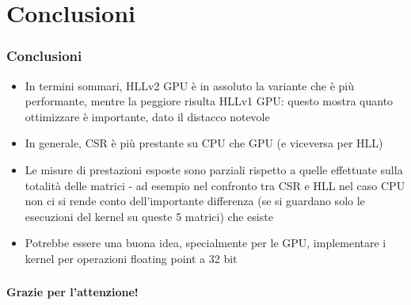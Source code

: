 \documentclass{beamer}
\begin{document}
\section{Conclusioni}
\begin{frame}
	\frametitle{Conclusioni}
	
	\begin{itemize}
		\item 
		In termini sommari, HLLv2 GPU è in assoluto la variante che è più performante, mentre la
		peggiore risulta HLLv1 GPU: questo mostra quanto 
		ottimizzare è importante, dato il distacco
		notevole
	
		\item In generale, CSR è più prestante su CPU che GPU (e viceversa per HLL)
	
		\item Le misure di prestazioni esposte sono parziali rispetto a quelle effettuate sulla
		totalità delle matrici - ad esempio nel confronto tra CSR e HLL nel caso CPU non ci si 
		rende conto dell'importante differenza (se si guardano solo le esecuzioni 
		del kernel su queste 5 matrici) che esiste
		
		\item Potrebbe essere una buona idea, specialmente per le GPU, implementare i kernel
		per operazioni floating point a 32 bit
		
	\end{itemize}
		
\end{frame}

\begin{frame}
    \frametitle{}
    
    \fontsize{30pt}{10pt}\selectfont
    \centering
    \textbf{Grazie per l'attenzione!}
    
\end{frame}
\end{document}
